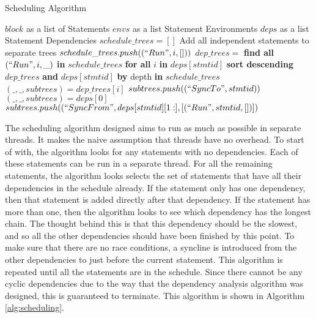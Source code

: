 \begin{algorithm}[H]
\caption{Scheduling Algorithm}
\label{alg:scheduling}
\begin{algorithmic}[1]
    \Require $block$ as a list of Statements
    \Require $envs$ as a list Statement Environments
    \Require $deps$ as a list Statement Dependencies
    \State $schedule\_trees = []$
     \Comment Add all independent statements to separate trees
            \State $schedule\_trees.push((``Run", i, []))$
        \EndIf
    \EndFor
                \State $dep\_trees =$ \textbf{find all} $(``Run", i, \_)$ \textbf{in} $schedule\_trees$ \textbf{for all} $i$ \textbf{in} $deps[stmtid]$
                \State \textbf{sort descending} $dep\_trees$ \textbf{and} $deps[stmtid]$ \textbf{by} depth \textbf{in} $schedule\_trees$
                    \State $(\_,\_,subtrees) = dep\_trees[i]$
                    \State $subtrees.push((``SyncTo", stmtid))$
                \EndFor
                \State $(\_,\_,subtrees) = deps[0]$
                \State $subtrees.push((``SyncFrom", deps[stmtid][1:], [(``Run", stmtid, [])])$
            \EndIf
        \EndFor
    \EndWhile
\end{algorithmic}
\end{algorithm}

The scheduling algorithm designed aims to run as much as possible in separate threads. It makes the naive assumption that threads have no overhead. To start of with, the algorithm looks for any statements with no dependencies. Each of these statements can be run in a separate thread. For all the remaining statements, the algorithm looks selects the set of statements that have all their dependencies in the schedule already. If the statement only has one dependency, then that statement is added directly after that dependency. If the statement has more than one, then the algorithm looks to see which dependency has the longest chain. The thought behind this is that this dependency should be the slowest, and so all the other dependencies should have been finished by this point. To make sure that there are no race conditions, a syncline is introduced from the other dependencies to just before the current statement. This algorithm is repeated until all the statements are in the schedule. Since there cannot be any cyclic dependencies due to the way that the dependency analysis algorithm was designed, this is guaranteed to terminate. This algorithm is shown in Algorithm \autoref{alg:scheduling}.
